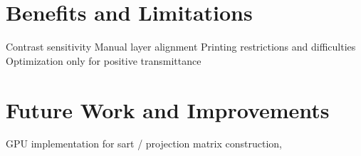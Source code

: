 \section{Benefits and Limitations}
\label{sec:benefits_limitations}

Contrast sensitivity
Manual layer alignment
Printing restrictions and difficulties
Optimization only for positive transmittance

\section{Future Work and Improvements}
\label{sec:future_work}

GPU implementation for sart / projection matrix construction, 
